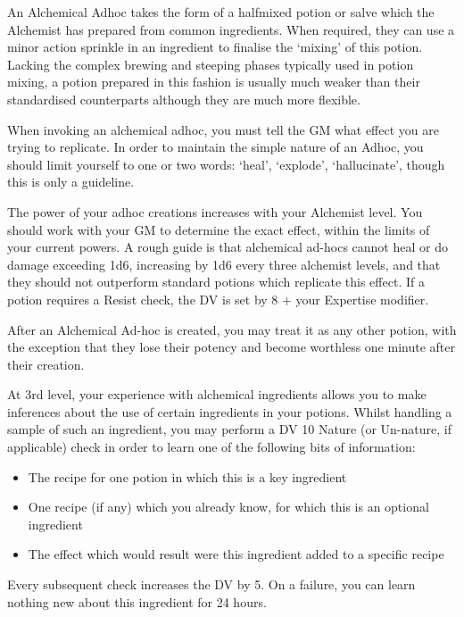 {
	An Alchemical Ad\minus{}hoc takes the form of a half\minus{}mixed potion or salve which the Alchemist has prepared from common ingredients. When required, they can use a minor action sprinkle in an ingredient to finalise the `mixing' of this potion. Lacking the complex brewing and steeping phases typically used in potion mixing, a potion prepared in this fashion is usually much weaker than their standardised counterparts \minus{} although they are much more flexible. 
	
	 When invoking an alchemical ad\minus{}hoc, you must tell the GM what effect you are trying to replicate. In order to maintain the simple nature of an Ad\minus{}hoc, you should limit yourself to one or two words: `heal', `explode', `hallucinate', though this is only a guideline. 
	 
	 The power of your ad\minus{}hoc creations increases with your Alchemist level. You should work with your GM to determine the exact effect, within the limits of your current powers. A rough guide is that alchemical ad-hocs cannot heal or do damage exceeding 1d6, increasing by 1d6 every three alchemist levels, and that they should not outperform standard potions which replicate this effect. If a potion requires a Resist check, the DV is set by 8 + your Expertise modifier. 
	 
	 After an Alchemical Ad-hoc is created, you may treat it as any other potion, with the exception that they lose their potency and become worthless one minute after their creation. 
}

{
	At 3rd level, your experience with alchemical ingredients allows you to make inferences about the use of certain ingredients in your potions. Whilst handling a sample of such an ingredient, you may perform a DV 10 Nature (or Un-nature, if applicable) check in order to learn one of the following bits of information:
	
	\begin{itemize}
		\item The recipe for one potion in which this is a key ingredient
		\item One recipe (if any) which you already know, for which this is an optional ingredient
		\item The effect which would result were this ingredient added to a specific recipe
	\end{itemize}
	
	Every subsequent check increases the DV by 5. On a failure, you can learn nothing new about this ingredient for 24 hours.
}

